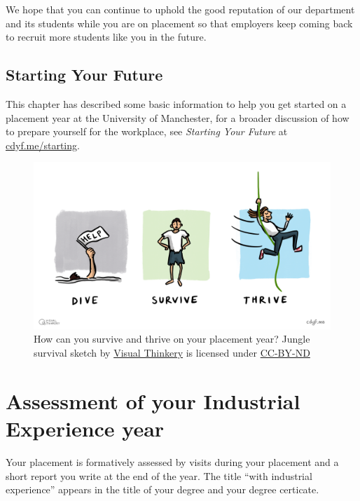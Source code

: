 \documentclass[
]{book}
\begin{document}
We hope that you can continue to uphold the good reputation of our department and its students while you are on placement so that employers keep coming back to recruit more students like you in the future.

\section{Starting Your Future}\label{etc}

This chapter has described some basic information to help you get started on a placement year at the University of Manchester, for a broader discussion of how to prepare yourself for the workplace, see \emph{Starting Your Future} at \href{https://www.cdyf.me/starting}{cdyf.me/starting}. \citep{starting}

\begin{figure}

{\centering \includegraphics[width=1\linewidth]{images/DiveThriveSurvive} 

}

\caption{How can you survive and thrive on your placement year? Jungle survival sketch by \href{https://visualthinkery.com}{Visual Thinkery} is licensed under \href{https://creativecommons.org/licenses/by-nd/4.0/}{CC-BY-ND}}\label{fig:survival-fig}
\end{figure}



\chapter{Assessment of your Industrial Experience year}\label{assessment}

Your placement is formatively assessed by visits during your placement and a short report you write at the end of the year. The title ``with industrial experience'' appears in the title of your degree and your degree certicate.
\end{document}
